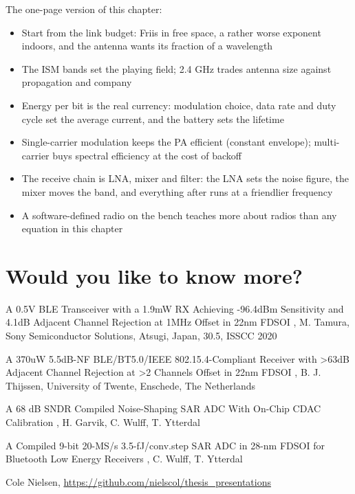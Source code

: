 The one-page version of this chapter:

\begin{itemize}
\tightlist
\item
  Start from the link budget: Friis in free space, a rather worse
  exponent indoors, and the antenna wants its fraction of a wavelength
\item
  The ISM bands set the playing field; 2.4 GHz trades antenna size
  against propagation and company
\item
  Energy per bit is the real currency: modulation choice, data rate and
  duty cycle set the average current, and the battery sets the lifetime
\item
  Single-carrier modulation keeps the PA efficient (constant envelope);
  multi-carrier buys spectral efficiency at the cost of backoff
\item
  The receive chain is LNA, mixer and filter: the LNA sets the noise
  figure, the mixer moves the band, and everything after runs at a
  friendlier frequency
\item
  A software-defined radio on the bench teaches more about radios than
  any equation in this chapter
\end{itemize}

\section{Would you like to know
more?}\label{would-you-like-to-know-more}

A 0.5V BLE Transceiver with a 1.9mW RX Achieving -96.4dBm Sensitivity
and 4.1dB Adjacent Channel Rejection at 1MHz Offset in 22nm FDSOI
, M. Tamura, Sony Semiconductor
Solutions, Atsugi, Japan, 30.5, ISSCC 2020

A 370uW 5.5dB-NF BLE/BT5.0/IEEE 802.15.4-Compliant Receiver with
\textgreater63dB Adjacent Channel Rejection at \textgreater2 Channels
Offset in 22nm FDSOI , B. J. Thijssen,
University of Twente, Enschede, The Netherlands

A 68 dB SNDR Compiled Noise-Shaping SAR ADC With On-Chip CDAC
Calibration , H. Garvik, C. Wulff, T.
Ytterdal

A Compiled 9-bit 20-MS/s 3.5-fJ/conv.step SAR ADC in 28-nm FDSOI for
Bluetooth Low Energy Receivers , C.
Wulff, T. Ytterdal

Cole Nielsen, \url{https://github.com/nielscol/thesis_presentations}

